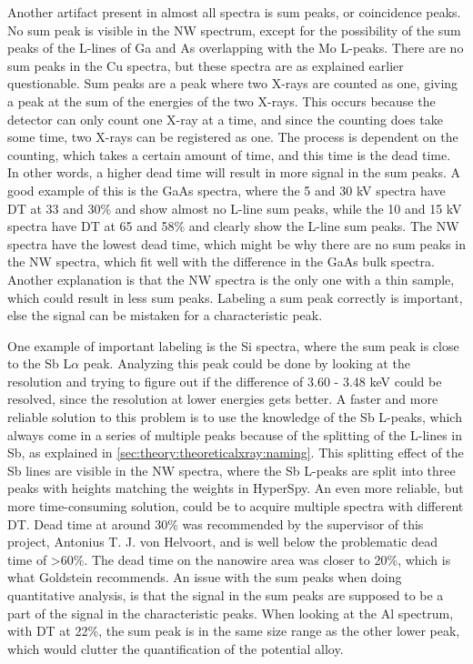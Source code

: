 Another artifact present in almost all spectra is sum peaks, or coincidence peaks.
No sum peak is visible in the NW spectrum, except for the possibility of the sum peaks of the L-lines of Ga and As overlapping with the Mo L-peaks.
There are no sum peaks in the Cu spectra, but these spectra are as explained earlier questionable.
Sum peaks are a peak where two X-rays are counted as one, giving a peak at the sum of the energies of the two X-rays.
This occurs because the detector can only count one X-ray at a time, and since the counting does take some time, two X-rays can be registered as one.
The process is dependent on the counting, which takes a certain amount of time, and this time is the dead time.
In other words, a higher dead time will result in more signal in the sum peaks.
A good example of this is the GaAs spectra, where the 5 and 30 kV spectra have DT at 33 and 30\% and show almost no L-line sum peaks, while the 10 and 15 kV spectra have DT at 65 and 58\% and clearly show the L-line sum peaks.
The NW spectra have the lowest dead time, which might be why there are no sum peaks in the NW spectra, which fit well with the difference in the GaAs bulk spectra.
Another explanation is that the NW spectra is the only one with a thin sample, which could result in less sum peaks.
Labeling a sum peak correctly is important, else the signal can be mistaken for a characteristic peak.

One example of important labeling is the Si spectra, where the sum peak is close to the Sb L$\alpha$ peak.
Analyzing this peak could be done by looking at the resolution and trying to figure out if the difference of 3.60 - 3.48 keV could be resolved, since the resolution at lower energies gets better.
A faster and more reliable solution to this problem is to use the knowledge of the Sb L-peaks, which always come in a series of multiple peaks because of the splitting of the L-lines in Sb, as explained in \cref{sec:theory:theoreticalxray:naming}.
This splitting effect of the Sb lines are visible in the NW spectra, where the Sb L-peaks are split into three peaks with heights matching the weights in HyperSpy.
An even more reliable, but more time-consuming solution, could be to acquire multiple spectra with different DT.
Dead time at around 30\% was recommended by the supervisor of this project, Antonius T. J. von Helvoort, and is well below the problematic dead time of >60\%.
The dead time on the nanowire area was closer to 20\%, which is what Goldstein \cite[page 223]{goldstein_scanning_2018} recommends.
An issue with the sum peaks when doing quantitative analysis, is that the signal in the sum peaks are supposed to be a part of the signal in the characteristic peaks.
When looking at the Al spectrum, with DT at 22\%, the sum peak is in the same size range as the other lower peak, which would clutter the quantification of the potential alloy.


